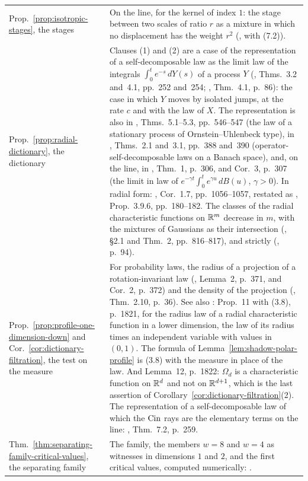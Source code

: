 {\begin{longtable}{@{}S{0.2\textwidth}S{0.76\textwidth}@{}}
\addlinespace
Prop.~\ref{prop:isotropic-stages}, the stages &
  On the line, for the \Matern{} kernel of index $1$: the stage between two scales of ratio $r$
  as a mixture in which no displacement has the weight $r^2$ (, with (7.2)). \\
\addlinespace
Prop.~\ref{prop:radial-dictionary}, the dictionary &
  Clauses (1) and (2) are a case of the representation of a self-decomposable law as the limit
  law of the integrals $\int_0^t e^{-s}\,dY(s)$ of a \Levy{} process $Y$
  (, Thms.~3.2 and~4.1, pp.~252 and~254; ,
  Thm.~4.1, p.~86): the case in which $Y$ moves by isolated jumps, at the rate $c$ and with the
  law of $X$. The representation is also in , Thms.~5.1--5.3,
  pp.~546--547 (the law of a stationary process of Ornstein--Uhlenbeck type), in
  , Thms.~2.1 and~3.1, pp.~388 and~390 (operator-self-decomposable
  laws on a Banach space), and, on the line, in , Thm.~1, p.~306,
  and Cor.~3, p.~307 (the limit in law of $e^{-\gamma t}\int_0^t e^{\gamma u}\,dB(u)$,
  $\gamma > 0$). In radial form: , Cor.~1.7, pp.~1056--1057, restated as
  , Prop.~3.9.6, pp.~180--182. The classes of the radial
  characteristic functions on $\mathbb{R}^m$ decrease in $m$, with the mixtures of Gaussians as their
  intersection (, \S2.1 and Thm.~2, pp.~816--817), and strictly
  (, p.~94). \\
\addlinespace
Prop.~\ref{prop:profile-one-dimension-down} and Cor.~\ref{cor:dictionary-filtration}, the test
on the \Levy{} measure &
  For probability laws, the radius of a projection of a rotation-invariant law
  (, Lemma~2, p.~371, and Cor.~2, p.~372) and the density of the
  projection (, Thm.~2.10, p.~36). See also
  : Prop.~11 with (3.8), p.~1821, for the radius law of a radial
  characteristic function in a lower dimension, the law of its radius times an independent
  variable with values in $(0,1)$. The formula of Lemma~\ref{lem:shadow-polar-profile} is (3.8)
  with the \Levy{} measure in place of the law. And Lemma~12, p.~1822: $\Omega_d$ is a
  characteristic function on $\mathbb{R}^d$ and not on $\mathbb{R}^{d+1}$, which is the last assertion of
  Corollary~\ref{cor:dictionary-filtration}(2). The representation of a
  self-decomposable law of which the $\operatorname{Cin}$ rays are the elementary terms on the line:
  , Thm.~7.2, p.~259. \\
\addlinespace
Thm.~\ref{thm:separating-family-critical-values}, the separating family &
  The family, the members $w = 8$ and $w = 4$ as witnesses in dimensions $1$ and $2$, and the
  first critical values, computed numerically: . \\
\end{longtable}
}
